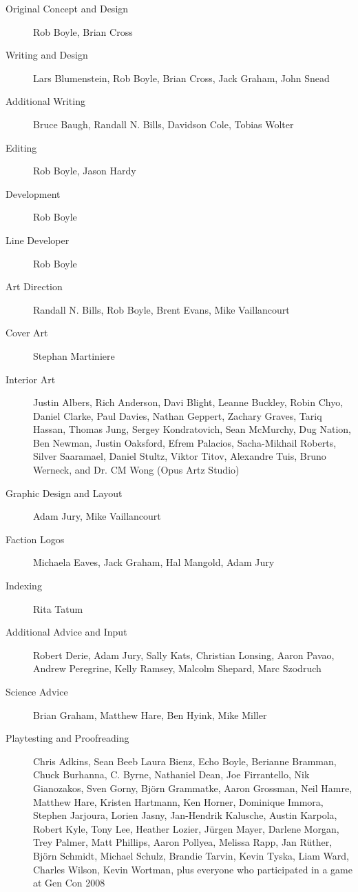 \begin{description}

\item[Original Concept and Design] Rob Boyle, Brian Cross

\item[Writing and Design] Lars Blumenstein, Rob Boyle, Brian Cross, Jack
  Graham, John Snead

\item[Additional Writing] Bruce Baugh, Randall N. Bills, Davidson Cole, Tobias
  Wolter

\item[Editing] Rob Boyle, Jason Hardy

\item[Development] Rob Boyle

\item[Line Developer] Rob Boyle

\item[Art Direction] Randall N. Bills, Rob Boyle, Brent Evans, Mike
  Vaillancourt

\item[Cover Art] Stephan Martiniere

\item[Interior Art] Justin Albers, Rich Anderson, Davi Blight, Leanne Buckley,
  Robin Chyo, Daniel Clarke, Paul Davies, Nathan Geppert, Zachary Graves, Tariq
  Hassan, Thomas Jung, Sergey Kondratovich, Sean McMurchy, Dug Nation, Ben
  Newman, Justin Oaksford, Efrem Palacios, Sacha-Mikhail Roberts, Silver
  Saaramael, Daniel Stultz, Viktor Titov, Alexandre Tuis, Bruno Werneck, and
  Dr. CM Wong (Opus Artz Studio)

\item[Graphic Design and Layout] Adam Jury, Mike Vaillancourt

\item[Faction Logos] Michaela Eaves, Jack Graham, Hal Mangold, Adam Jury

\item[Indexing] Rita Tatum

\item[Additional Advice and Input] Robert Derie, Adam Jury, Sally Kats,
  Christian Lonsing, Aaron Pavao, Andrew Peregrine, Kelly Ramsey, Malcolm
  Shepard, Marc Szodruch

\item[Science Advice] Brian Graham, Matthew Hare, Ben Hyink, Mike Miller

\item[Playtesting and Proofreading] Chris Adkins, Sean Beeb Laura Bienz, Echo
  Boyle, Berianne Bramman, Chuck Burhanna, C. Byrne, Nathaniel Dean, Joe
  Firrantello, Nik Gianozakos, Sven Gorny, Björn Grammatke, Aaron Grossman,
  Neil Hamre, Matthew Hare, Kristen Hartmann, Ken Horner, Dominique Immora,
  Stephen Jarjoura, Lorien Jasny, Jan-Hendrik Kalusche, Austin Karpola, Robert
  Kyle, Tony Lee, Heather Lozier, Jürgen Mayer, Darlene Morgan, Trey Palmer,
  Matt Phillips, Aaron Pollyea, Melissa Rapp, Jan Rüther, Björn Schmidt,
  Michael Schulz, Brandie Tarvin, Kevin Tyska, Liam Ward, Charles Wilson, Kevin
  Wortman, plus everyone who participated in a game at Gen Con 2008


\end{description}
